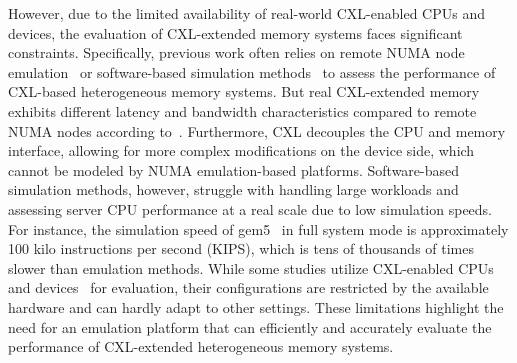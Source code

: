 However, due to the limited availability of real-world CXL-enabled CPUs and devices, the evaluation of CXL-extended memory systems faces significant constraints. Specifically, previous work often relies on remote NUMA node emulation~\cite{tpp_asplos23, memtis_sosp23} or software-based simulation methods~\cite{cxlanns_atc23} to assess the performance of CXL-based heterogeneous memory systems.
But real CXL-extended memory exhibits different latency and bandwidth characteristics compared to remote NUMA nodes according to~\cite{caption_micro23}. Furthermore, CXL decouples the CPU and memory interface, allowing for more complex modifications on the device side, which cannot be modeled by NUMA emulation-based platforms. 
Software-based simulation methods, however, struggle with handling large workloads and assessing server CPU performance at a real scale due to low simulation speeds. For instance, the simulation speed of gem5~\cite{lowepower2020gem5simulatorversion200} in full system mode is approximately 100 kilo instructions per second (KIPS), which is tens of thousands of times slower than emulation methods.  While some studies utilize CXL-enabled CPUs and devices~\cite{caption_micro23, cxlshm_sosp23, Sano_2023} for evaluation, their configurations are restricted by the available hardware  and can hardly adapt to other settings. 
These limitations highlight the need for an emulation platform that can efficiently and accurately evaluate the performance of CXL-extended heterogeneous memory systems.


\vspace{5pt}
\noindent{}
\vspace{5pt}




